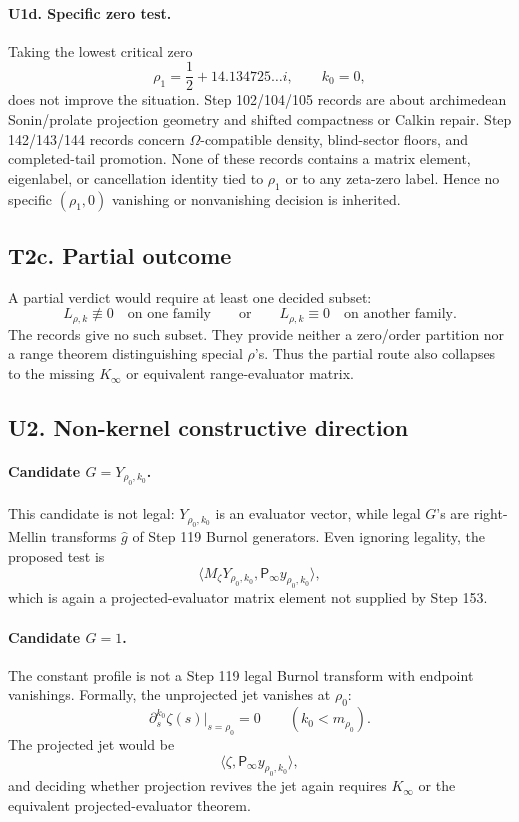 \documentclass[11pt]{article}
\newcommand{\Psym}{\mathsf P_\infty}
\newcommand{\Mz}{M_\zeta}
\begin{document}
\paragraph{U1d. Specific zero test.}
Taking the lowest critical zero
\[
  \rho_1=\frac12+14.134725\ldots i,\qquad k_0=0,
\]
does not improve the situation.  Step 102/104/105 records are about
archimedean Sonin/prolate projection geometry and shifted compactness or
Calkin repair.  Step 142/143/144 records concern \(\Omega\)-compatible density,
blind-sector floors, and completed-tail promotion.  None of these records
contains a matrix element, eigenlabel, or cancellation identity tied to
\(\rho_1\) or to any zeta-zero label.  Hence no specific \((\rho_1,0)\)
vanishing or nonvanishing decision is inherited.

\subsection*{T2c. Partial outcome}

A partial verdict would require at least one decided subset:
\[
  L_{\rho,k}\not\equiv0\quad\text{on one family}
  \qquad\text{or}\qquad
  L_{\rho,k}\equiv0\quad\text{on another family}.
\]
The records give no such subset.  They provide neither a zero/order partition
nor a range theorem distinguishing special \(\rho\)'s.  Thus the partial route
also collapses to the missing \(K_\infty\) or equivalent range-evaluator
matrix.

\subsection*{U2. Non-kernel constructive direction}

\paragraph{Candidate \(G=Y_{\rho_0,k_0}\).}
This candidate is not legal: \(Y_{\rho_0,k_0}\) is an evaluator vector, while
legal \(G\)'s are right-Mellin transforms \(\widehat g\) of Step 119 Burnol
generators.  Even ignoring legality, the proposed test is
\[
  \langle \Mz Y_{\rho_0,k_0},\Psym y_{\rho_0,k_0}\rangle,
\]
which is again a projected-evaluator matrix element not supplied by Step 153.

\paragraph{Candidate \(G=1\).}
The constant profile is not a Step 119 legal Burnol transform with endpoint
vanishings.  Formally, the unprojected jet vanishes at \(\rho_0\):
\[
  \partial_s^{k_0}\zeta(s)\big|_{s=\rho_0}=0
  \qquad(k_0<m_{\rho_0}).
\]
The projected jet would be
\[
  \langle \zeta,\Psym y_{\rho_0,k_0}\rangle,
\]
and deciding whether projection revives the jet again requires \(K_\infty\) or
the equivalent projected-evaluator theorem.
\end{document}
